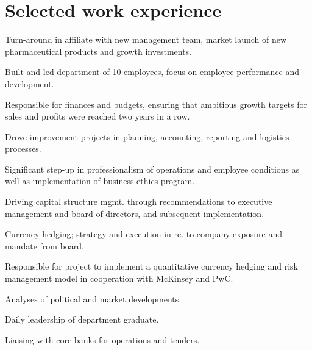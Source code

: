 \documentclass[a4paper]{janus-resume}
\begin{document}
\begin{minipage}[t]{0.49\textwidth} %


\section{Selected work experience}


\vspace{\topsep} %
\begin{tightitemize}
\item Turn-around in affiliate with new management team, market launch of new pharmaceutical products and growth investments.
\item Built and led department of 10 employees, focus on employee performance and development.
\item Responsible for finances and budgets, ensuring that ambitious growth targets for sales and profits were reached two years in a row.
\item Drove improvement projects in planning, accounting, reporting and logistics processes.
\item Significant step-up in professionalism of operations and employee conditions as well as implementation of business ethics program. 
\end{tightitemize}

\sectionspace %



\begin{tightitemize}
\item Driving capital structure mgmt. through recommendations to executive management and board of directors, and subsequent implementation.
\item Currency hedging; strategy and execution in re. to company exposure and mandate from board.
\item Responsible for project to implement a quantitative currency hedging and risk management model in cooperation with McKinsey and PwC. 
\item Analyses of political and market developments.
\item Daily leadership of department graduate.
\item Liaising with core banks for operations and tenders.
\end{tightitemize}


\end{minipage}
\end{document}
